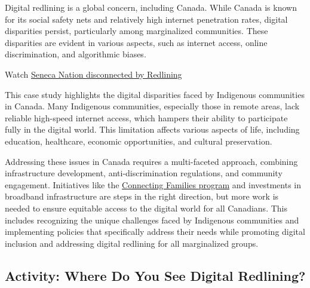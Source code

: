 \documentclass[
]{book}
\theoremstyle{definition}
\theoremstyle{definition}
\theoremstyle{definition}
\theoremstyle{definition}
\theoremstyle{remark}
\begin{document}
\begin{reflect}
Digital redlining is a global concern, including Canada. While Canada is known for its social safety nets and relatively high internet penetration rates, digital disparities persist, particularly among marginalized communities. These disparities are evident in various aspects, such as internet access, online discrimination, and algorithmic biases.

Watch \href{https://www.youtube.com/watch?v=J5NV9BJx1_M}{Seneca Nation disconnected by Redlining}

This case study highlights the digital disparities faced by Indigenous communities in Canada. Many Indigenous communities, especially those in remote areas, lack reliable high-speed internet access, which hampers their ability to participate fully in the digital world. This limitation affects various aspects of life, including education, healthcare, economic opportunities, and cultural preservation.

Addressing these issues in Canada requires a multi-faceted approach, combining infrastructure development, anti-discrimination regulations, and community engagement. Initiatives like the \href{https://ised-isde.canada.ca/site/connecting-families/en}{Connecting Families program} and investments in broadband infrastructure are steps in the right direction, but more work is needed to ensure equitable access to the digital world for all Canadians. This includes recognizing the unique challenges faced by Indigenous communities and implementing policies that specifically address their needs while promoting digital inclusion and addressing digital redlining for all marginalized groups.
\end{reflect}

\hypertarget{activity-where-do-you-see-digital-redlining}{%
\subsection*{Activity: Where Do You See Digital Redlining?}\label{activity-where-do-you-see-digital-redlining}}
\end{document}
